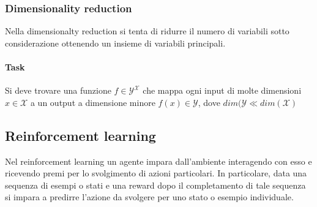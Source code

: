 		\subsubsection{Dimensionality reduction}
		Nella dimensionalty reduction si tenta di ridurre il numero di variabili sotto considerazione ottenendo un insieme di variabili principali.

			\paragraph{Task}
			Si deve trovare una funzione $f\in\mathcal{Y}^\mathcal{X}$ che mappa ogni input di molte dimensioni $x\in\mathcal{X}$ a un output a dimensione minore $f(x)\in\mathcal{Y}$, dove $dim(\mathcal{Y}\ll dim(\mathcal{X})$

	\subsection{Reinforcement learning}
	Nel reinforcement learning un agente impara dall'ambiente interagendo con esso e ricevendo premi per lo svolgimento di azioni particolari.
	In particolare, data una sequenza di esempi o stati e una reward dopo il completamento di tale sequenza si impara a predirre l'azione da svolgere per uno stato o esempio individuale.
